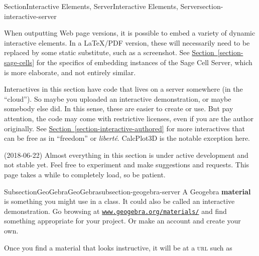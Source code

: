 \documentclass[twoside,10pt,]{article}
\newcommand{\xreffont}{\relax}
\newcommand{\initialism}[1]{\textsc{\MakeLowercase{#1}}}
\newcommand{\terminology}[1]{\textbf{#1}}
\numberwithin{equation}{section}
\begin{document}
%
%
\typeout{************************************************}
\typeout{************************************************}
%
\begin{sectionptx}{Section}{Interactive Elements, Server}{}{Interactive Elements, Server}{}{}{section-interactive-server}
%
%
\begin{introduction}{}%
When outputting Web page versions, it is possible to embed a variety of dynamic interactive elements.  In a \LaTeX{}\slash{}PDF version, these will necessarily need to be replaced by some static substitute, such as a screenshot.  See \hyperref[section-sage-cells]{Section~{\xreffont\ref{section-sage-cells}}} for the specifics of embedding instances of the Sage Cell Server, which is more elaborate, and not entirely similar.%
\par
Interactives in this section have code that lives on a server somewhere (in the ``cloud'').  So maybe you uploaded an interactive demonstration, or maybe somebody else did.  In this sense, these are easier to create or use.  But pay attention, the code may come with restrictive licenses, even if you are the author originally.  See \hyperref[section-interactive-authored]{Section~{\xreffont\ref{section-interactive-authored}}} for more interactives that can be free as in ``freedom'' or \textit{liberté}.  CalcPlot3D is the notable exception here.%
\par
(2018-06-22) Almost everything in this section is under active development and not stable yet.  Feel free to experiment and make suggestions and requests.  This page takes a while to completely load, so be patient.%
\end{introduction}%
%
%
\typeout{************************************************}
\typeout{************************************************}
%
\begin{subsectionptx}{Subsection}{GeoGebra}{}{GeoGebra}{}{}{subsection-geogebra-server}
%
%
A Geogebra \terminology{material} is something you might use in a class.  It could also be called an interactive demonstration.  Go browsing at \href{https://www.geogebra.org/materials/}{\nolinkurl{www.geogebra.org/materials/}} and find something appropriate for your project.  Or make an account and create your own.%
\par
Once you find a material that looks instructive, it will be at a \initialism{URL} such as%

\end{subsectionptx}
\end{sectionptx}
\end{document}
